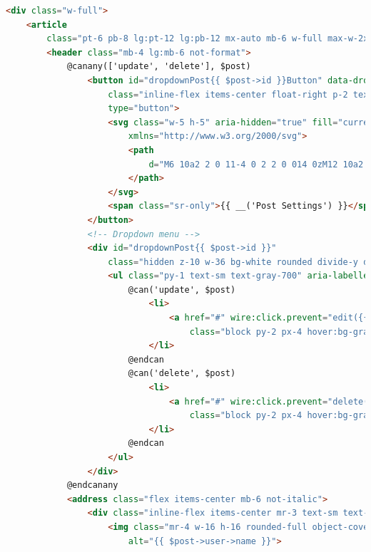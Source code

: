 \begin{lstlisting}[caption={\texttt{show-post.blade.php} - Blade datoteka Livewire komponente}, label=showPostBlade, language=HTML, escapechar=|]
<div class="w-full">
    <article
        class="pt-6 pb-8 lg:pt-12 lg:pb-12 mx-auto mb-6 w-full max-w-2xl format format-sm sm:format-base lg:format-lg format-blue">
        <header class="mb-4 lg:mb-6 not-format">
            @canany(['update', 'delete'], $post)
                <button id="dropdownPost{{ $post->id }}Button" data-dropdown-toggle="dropdownPost{{ $post->id }}"
                    class="inline-flex items-center float-right p-2 text-sm font-medium text-center text-gray-400 bg-white rounded-lg hover:bg-gray-100 focus:ring-4 focus:outline-none focus:ring-gray-50"
                    type="button">
                    <svg class="w-5 h-5" aria-hidden="true" fill="currentColor" viewBox="0 0 20 20"
                        xmlns="http://www.w3.org/2000/svg">
                        <path
                            d="M6 10a2 2 0 11-4 0 2 2 0 014 0zM12 10a2 2 0 11-4 0 2 2 0 014 0zM16 12a2 2 0 100-4 2 2 0 000 4z">
                        </path>
                    </svg>
                    <span class="sr-only">{{ __('Post Settings') }}</span>
                </button>
                <!-- Dropdown menu -->
                <div id="dropdownPost{{ $post->id }}"
                    class="hidden z-10 w-36 bg-white rounded divide-y divide-gray-100 shadow">
                    <ul class="py-1 text-sm text-gray-700" aria-labelledby="dropdownMenuIconHorizontalButton">
                        @can('update', $post)
                            <li>
                                <a href="#" wire:click.prevent="edit({{ $post->id }})"
                                    class="block py-2 px-4 hover:bg-gray-100">{{ __('Edit') }}</a>
                            </li>
                        @endcan
                        @can('delete', $post)
                            <li>
                                <a href="#" wire:click.prevent="delete({{ $post->id }})"
                                    class="block py-2 px-4 hover:bg-gray-100">{{ __('Delete') }}</a>
                            </li>
                        @endcan
                    </ul>
                </div>
            @endcanany
            <address class="flex items-center mb-6 not-italic">
                <div class="inline-flex items-center mr-3 text-sm text-gray-900">
                    <img class="mr-4 w-16 h-16 rounded-full object-cover" src="{{ $post->user->profile_photo_url }}"
                        alt="{{ $post->user->name }}">

\end{lstlisting}

